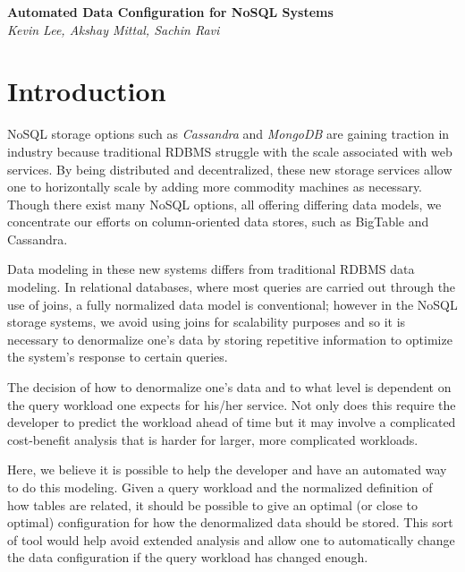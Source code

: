\documentclass[12pt]{article}
\begin{document}
\pagestyle{plain}

\begin{center}
  \Large\textbf{Automated Data Configuration for NoSQL Systems}\\
  \large\textit{Kevin Lee, Akshay Mittal, Sachin Ravi}
\end{center}

\bigskip

\section{Introduction}
NoSQL storage options such as \emph{Cassandra} and \emph{MongoDB} are gaining traction in industry because traditional
RDBMS struggle with the scale associated with web services. By being distributed and decentralized, these new storage 
services allow one to horizontally scale by adding more commodity machines as necessary. Though there exist many NoSQL
options, all offering differing data models, we concentrate our efforts on column-oriented data stores, such as BigTable
and Cassandra.

Data modeling in these new systems differs from traditional RDBMS data modeling. In relational databases, where most queries
are carried out through the use of joins, a fully normalized data model is conventional; however in the NoSQL storage systems, 
we avoid using joins for scalability purposes and so it is necessary to denormalize one's data by storing repetitive information 
to optimize the system's response to certain queries.

The decision of how to denormalize one's data and to what level is dependent on the query workload one expects for his/her service.
Not only does this require the developer to predict the workload ahead of time but it may involve a complicated cost-benefit analysis that
is harder for larger, more complicated workloads.

Here, we believe it is possible to help the developer and have an automated way to do this modeling. Given a query workload and 
the normalized definition of how tables are related, it should be possible to give an optimal (or close to optimal) configuration 
for how the denormalized data should be stored. This sort of tool would help avoid extended analysis and allow one to automatically
change the data configuration if the query workload has changed enough.
\end{document}
